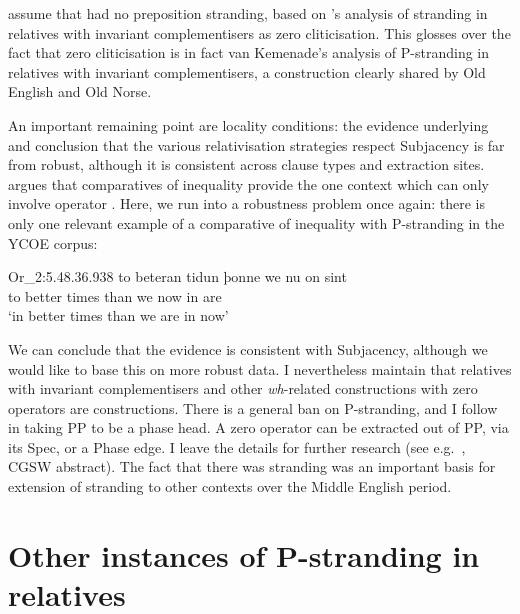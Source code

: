 \documentclass[output=paper]{langsci/langscibook}
\begin{document}
\citet{EmoFaa2014} assume that  had no preposition stranding, based
on ’s analysis of stranding in relatives with
invariant complementisers as zero cliticisation. This glosses over the fact
that zero cliticisation is in fact van Kemenade’s analysis of P-stranding in
relatives with invariant complementisers, a construction clearly shared by Old
English and Old Norse.

An important remaining point are locality conditions: the evidence underlying
 and  conclusion that the various
relativisation strategies respect Subjacency is far from robust, although it is
consistent across clause types and extraction sites. \citet[181--186]{Abels2003}
argues that comparatives of inequality provide the one context which can only
involve operator . Here, we run into a robustness problem once again:
there is only one relevant example of a comparative of inequality with
P-stranding in the YCOE corpus:

\ea Or\_2:5.48.36.938%
    \label{ex:key:11.9}
    \sn \gll to beteran tidun  þonne we nu    on sint \\
        to better    times than    we now in  are \\
    \glt ‘in better times than we are in now’
\z

We can conclude that the evidence is consistent with Subjacency, although we
would like to base this on more robust data. I nevertheless maintain that
relatives with invariant complementisers and other \textit{wh}-related
constructions with zero operators are  constructions. There is a
general ban on P-stranding, and I follow \textcite{Abels2003,Abels2012} in
taking PP to be a phase head. A zero operator can be extracted out of PP, via
its Spec, or a Phase edge. I leave the details for further research (see e.g.\
\citealt{Walkden2017}, CGSW abstract). The fact that there was stranding was an
important basis for extension of stranding to other contexts over the Middle
English period.

\section{Other instances of P-stranding in relatives}
\end{document}
